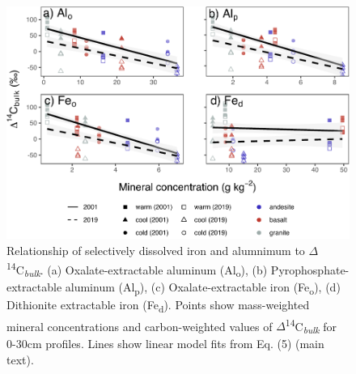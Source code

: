 \documentclass[english,man,floatsintext]{apa6}
\begin{document}
\begin{figure}

{\centering \includegraphics{sra-blk-inc-SI_files/figure-latex/min-all-blk-plot-1} 

}

\caption{Relationship of selectively dissolved iron and alumnimum to \(\Delta\)\textsuperscript{14}C\textsubscript{\emph{bulk}}. (a) Oxalate-extractable aluminum (Al\textsubscript{o}), (b) Pyrophosphate-extractable aluminum (Al\textsubscript{p}), (c) Oxalate-extractable iron (Fe\textsubscript{o}), (d) Dithionite extractable iron (Fe\textsubscript{d}). Points show mass-weighted mineral concentrations and carbon-weighted values of \(\Delta\)\textsuperscript{14}C\textsubscript{\emph{bulk}} for 0-30cm profiles. Lines show linear model fits from Eq. (5) (main text).}\label{fig:min-all-blk-plot}
\end{figure}
\end{document}
